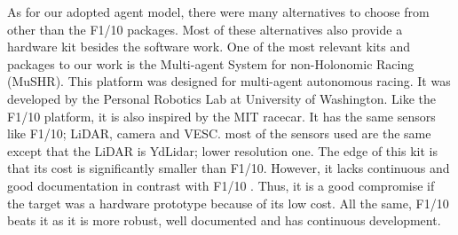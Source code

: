 As for our adopted agent model, there were many alternatives to choose from other than the F1/10 packages. Most of these alternatives also provide a hardware kit besides the software work\cite{Gonzales2016AutonomousDW}\cite{goldfain2019autorally}\cite{hyphaROS}\cite{SubodhMalgondeAutonomousCar}. One of the most relevant kits and packages to our work is the Multi-agent System for non-Holonomic Racing (MuSHR)\cite{srinivasa2019mushr}. This platform was designed for multi-agent autonomous racing. It was developed by the Personal Robotics Lab at University of Washington. Like the F1/10 platform, it is also inspired by the MIT racecar. It has the same sensors like F1/10; LiDAR, camera and VESC. most of the sensors used are the same except that the LiDAR is YdLidar; lower resolution one. The edge of this kit is that its cost is significantly smaller than F1/10. However, it lacks continuous and good documentation in contrast with F1/10 \cite{okelly2019f110}\cite{srinivasa2019mushr}. Thus, it is a good compromise if the target was a hardware prototype because of its low cost. All the same, F1/10 beats it as it is more robust, well documented and has continuous development.

